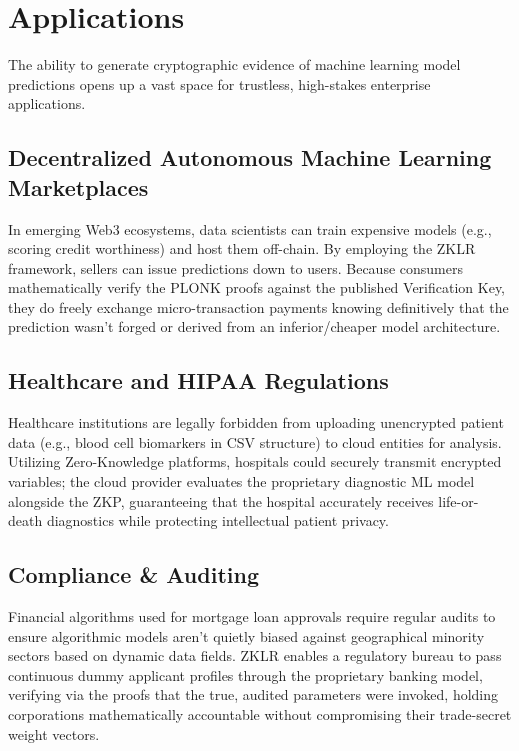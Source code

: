 \chapter{Applications}

The ability to generate cryptographic evidence of machine learning model predictions opens up a vast space for trustless, high-stakes enterprise applications.

\section{Decentralized Autonomous Machine Learning Marketplaces}
In emerging Web3 ecosystems, data scientists can train expensive models (e.g., scoring credit worthiness) and host them off-chain. By employing the ZKLR framework, sellers can issue predictions down to users. Because consumers mathematically verify the PLONK proofs against the published Verification Key, they do freely exchange micro-transaction payments knowing definitively that the prediction wasn't forged or derived from an inferior/cheaper model architecture.

\section{Healthcare and HIPAA Regulations}
Healthcare institutions are legally forbidden from uploading unencrypted patient data (e.g., blood cell biomarkers in CSV structure) to cloud entities for analysis. Utilizing Zero-Knowledge platforms, hospitals could securely transmit encrypted variables; the cloud provider evaluates the proprietary diagnostic ML model alongside the ZKP, guaranteeing that the hospital accurately receives life-or-death diagnostics while protecting intellectual patient privacy.

\section{Compliance \& Auditing}
Financial algorithms used for mortgage loan approvals require regular audits to ensure algorithmic models aren't quietly biased against geographical minority sectors based on dynamic data fields. ZKLR enables a regulatory bureau to pass continuous dummy applicant profiles through the proprietary banking model, verifying via the proofs that the true, audited parameters were invoked, holding corporations mathematically accountable without compromising their trade-secret weight vectors.
